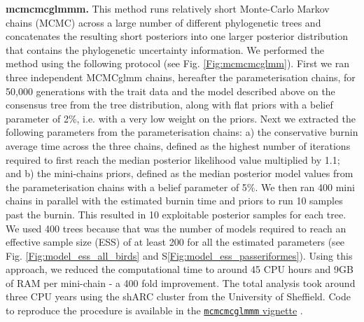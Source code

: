 \documentclass[12pt,letterpaper]{article}
\begin{document}
\textbf{mcmcmcglmmm.} This method runs relatively short Monte-Carlo Markov chains (MCMC) across a large number of different phylogenetic trees and concatenates the resulting short posteriors into one larger posterior distribution that contains the phylogenetic uncertainty information.
We performed the method using the following protocol (see Fig. \ref{Fig:mcmcmcglmm}).
First we ran three independent MCMCglmm chains, hereafter the parameterisation chains, for 50,000 generations with the trait data and the model described above on the consensus tree from the tree distribution, along with flat priors with a belief parameter of 2\%, i.e. with a very low weight on the priors.
Next we extracted the following parameters from the parameterisation chains: a) the conservative burnin average time across the three chains, defined as the highest number of iterations required to first reach the median posterior likelihood value multiplied by 1.1; and b) the mini-chains priors, defined as the median posterior model values from the parameterisation chains with a belief parameter of 5\%.
We then ran 400 mini chains in parallel with the estimated burnin time and priors to run 10 samples past the burnin.
This resulted in 10 exploitable posterior samples for each tree.
We used 400 trees because that was the number of models required to reach an effective sample size (ESS) of at least 200 for all the estimated parameters (see Fig. \ref{Fig:model_ess_all_birds} and S\ref{Fig:model_ess_passeriformes}).
Using this approach, we reduced the computational time to around 45 CPU hours and 9GB of RAM per mini-chain - a 400 fold improvement.
The total analysis took around three CPU years using the shARC cluster from the University of Sheffield.
Code to reproduce the procedure is available in the \href{https://raw.rawgit.net/TGuillerme/mcmcmcglmmm/main/inst/MCMCglmm_mini_chains.html}{\texttt{mcmcmcglmmm} vignette} \cite{mcmcmcglmmm}.
\end{document}
